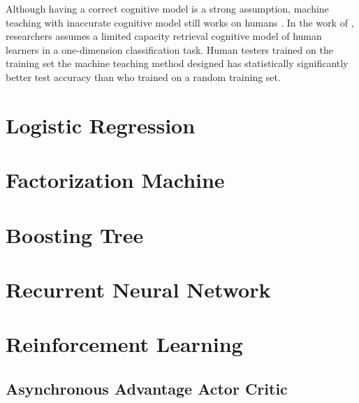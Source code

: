         Although having a correct cognitive model is a strong assumption,
        machine teaching with inaccurate cognitive model still works on humans \cite{Whitehill2017}.
        In the work of \cite{Patil2014},
        researchers assumes a limited capacity retrieval cognitive model of human learners
        in a one-dimension classification task.
        Human testers trained on the training set the machine teaching method designed
        has statistically significantly better test accuracy than who trained on a random training set.


\section{Logistic Regression}

\section{Factorization Machine}

\section{Boosting Tree}

\section{Recurrent Neural Network}

\section{Reinforcement Learning}

    \subsection{Asynchronous Advantage Actor Critic}
